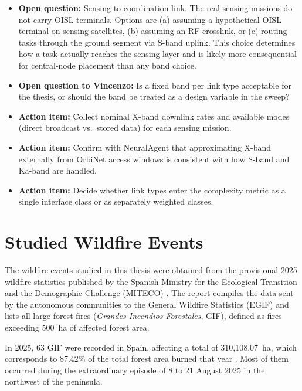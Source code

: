 \documentclass[11pt]{article}
\newcommand{\openquestion}[1]{\textcolor{openq}{\textbf{Open question:}} #1}
\newcommand{\vincenzoq}[1]{\textcolor{vincenzoq}{\textbf{Open question to Vincenzo:}} #1}
\newcommand{\actionitem}[1]{\textcolor{todo}{\textbf{Action item:}} #1}
\begin{document}
\begin{itemize}

    \item \openquestion{Sensing to coordination link. The real sensing missions do not carry OISL terminals. Options are (a) assuming a hypothetical OISL terminal on sensing satellites, (b) assuming an RF crosslink, or (c) routing tasks through the ground segment via S-band uplink. This choice determines how a task actually reaches the sensing layer and is likely more consequential for central-node placement than any band choice.}

    \item \vincenzoq{Is a fixed band per link type acceptable for the thesis, or should the band be treated as a design variable in the sweep?}

    \item \actionitem{Collect nominal X-band downlink rates and available modes (direct broadcast vs.\ stored data) for each sensing mission.}

    \item \actionitem{Confirm with NeuralAgent that approximating X-band externally from OrbiNet access windows is consistent with how S-band and Ka-band are handled.}

    \item \actionitem{Decide whether link types enter the complexity metric as a single interface class or as separately weighted classes.}

\end{itemize}

\section{Studied Wildfire Events} \label{sec:events}


The wildfire events studied in this thesis were obtained from the provisional 2025 wildfire statistics published by the Spanish Ministry for the Ecological Transition and the Demographic Challenge (MITECO) \cite{miteco2025avance}. The report compiles the data sent by the autonomous communities to the General Wildfire Statistics (EGIF) and lists all large forest fires (\emph{Grandes Incendios Forestales}, GIF), defined as fires exceeding 500~ha of affected forest area.

In 2025, 63 GIF were recorded in Spain, affecting a total of 310,108.07~ha, which corresponds to 87.42\% of the total forest area burned that year \cite{miteco2025avance}. Most of them occurred during the extraordinary episode of 8 to 21 August 2025 in the northwest of the peninsula.
\end{document}
